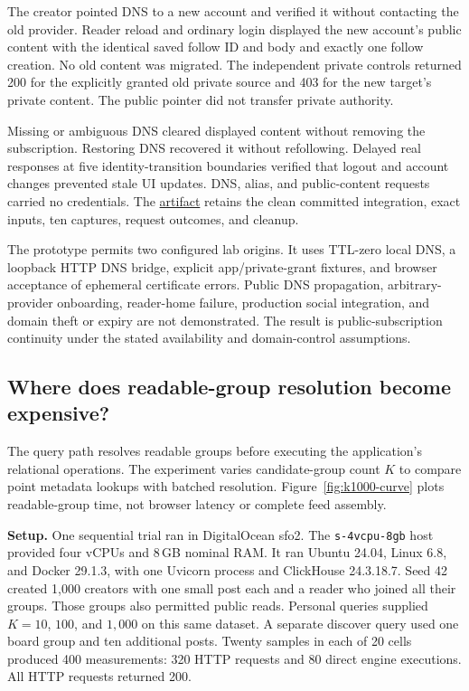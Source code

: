 \documentclass[sigconf, nonacm]{acmart}
\newcommand{\artifactbase}{https://github.com/jacoby149/web10}
\newcommand{\domainartifactrev}{26720acba859c7eb03fc5d26a6221cdde5b764a1}
\newcommand{\evidence}[2]{\href{\artifactbase/tree/\domainartifactrev/#1}{#2}}
\begin{document}
The creator pointed DNS to a new account and verified it without
contacting the old provider. Reader reload and ordinary login displayed
the new account's public content with the identical saved follow ID and
body and exactly one follow creation. No old content was migrated.
The independent private controls returned 200 for the explicitly granted
old private source and 403 for the new target's private content. The
public pointer did not transfer private authority.

Missing or ambiguous DNS cleared displayed content without removing
the subscription. Restoring DNS recovered it without refollowing.
Delayed real responses at five identity-transition boundaries verified
that logout and account changes prevented stale UI updates. DNS, alias,
and public-content requests carried no credentials. The
\evidence{research/domain-portability-demo}{artifact} retains the clean
committed integration, exact inputs, ten captures, request outcomes,
and cleanup.

The prototype permits two configured lab origins. It uses TTL-zero local
DNS, a loopback HTTP DNS bridge, explicit app/private-grant fixtures,
and browser acceptance of ephemeral certificate errors. Public DNS
propagation, arbitrary-provider onboarding, reader-home failure,
production social integration, and domain theft or expiry are not
demonstrated. The result is public-subscription continuity under the
stated availability and domain-control assumptions.

\subsection{Where does readable-group resolution become expensive?}
\label{sec:ev-cost}

The query path resolves readable groups before executing the application's
relational operations. The experiment varies candidate-group count
$K$ to compare point metadata lookups with batched resolution.
Figure~\ref{fig:k1000-curve} plots readable-group time, not browser
latency or complete feed assembly.

\textbf{Setup.} One sequential trial ran in DigitalOcean sfo2.
The \texttt{s-4vcpu-8gb} host provided four vCPUs and 8\,GB nominal RAM.
It ran Ubuntu 24.04, Linux 6.8, and Docker 29.1.3, with one Uvicorn
process and ClickHouse 24.3.18.7.
Seed 42 created 1,000 creators with one small post each and a reader who
joined all their groups. Those groups also permitted public reads.
Personal queries supplied $K=10$, $100$, and $1{,}000$ on this same
dataset. A separate discover query used one board group and ten
additional posts. Twenty samples in each of 20 cells produced 400
measurements: 320 HTTP requests and 80 direct engine executions.
All HTTP requests returned 200.
\end{document}
